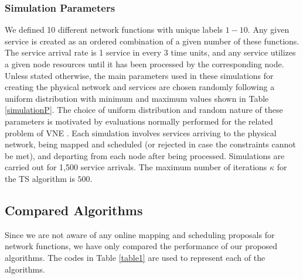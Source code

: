 \documentclass[conference]{IEEEtran}
\begin{document}
\subsubsection{Simulation Parameters}
We defined 10 different network functions with unique labels $1 - 10$. Any given service is created as an ordered combination of a given number of these functions. The service arrival rate is 1 service in every 3 time units, and any service utilizes a given node resources until it has been processed by the corresponding node. Unless stated otherwise, the main parameters used in these simulations for creating the physical network and services are chosen randomly following a uniform distribution with minimum and maximum values  shown in Table \ref{simulationP}. The choice of uniform distribution and random nature of these parameters is motivated by evaluations normally performed for the related problem of VNE \cite{Fischer13, neural, sdn}. Each simulation involves services arriving to the physical network, being mapped and scheduled (or rejected in case the constraints cannot be met), and departing from each node after being processed. Simulations are carried out for 1,500 service arrivals. The maximum number of iterations $\kappa$ for the TS algorithm is $500$.

\subsection{Compared Algorithms}
Since we are not aware of any online mapping and scheduling proposals for network functions, we have only compared the performance of our proposed algorithms. The codes in Table \ref{table1} are used to represent each of the algorithms.
\end{document}
